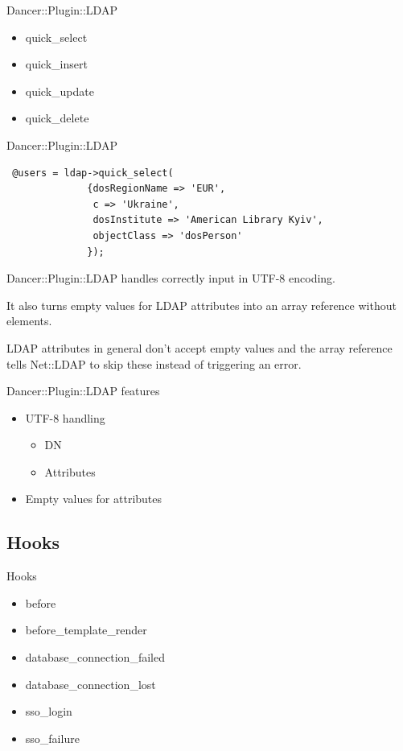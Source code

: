 \begin{frame}[fragile]{Dancer::Plugin::LDAP}
\begin{itemize}
\item quick\_select
\item quick\_insert
\item quick\_update
\item quick\_delete
\end{itemize}
\end{frame}

\begin{frame}[fragile]{Dancer::Plugin::LDAP}
\begin{lstlisting}
 @users = ldap->quick_select(
              {dosRegionName => 'EUR',
               c => 'Ukraine',
               dosInstitute => 'American Library Kyiv',
               objectClass => 'dosPerson'
              });
\end{lstlisting}
\end{frame}

Dancer::Plugin::LDAP handles correctly input in UTF-8 encoding.


It also turns empty values for LDAP attributes into an array
reference without elements.

LDAP attributes in general don't accept empty values and
the array reference tells Net::LDAP to skip these instead
of triggering an error.

\begin{frame}{Dancer::Plugin::LDAP features}
\begin{itemize}
\item UTF-8 handling
\begin{itemize}
    \item DN
    \item Attributes
\end{itemize}
\item Empty values for attributes
\end{itemize}
\end{frame}

\subsection{Hooks}
\begin{frame}{Hooks}
\begin{itemize}
\item before
\item before\_template\_render
\end{itemize}

\begin{itemize}
\item database\_connection\_failed
\item database\_connection\_lost
\end{itemize}

\begin{itemize}
\item sso\_login
\item sso\_failure
\end{itemize}

\end{frame}

